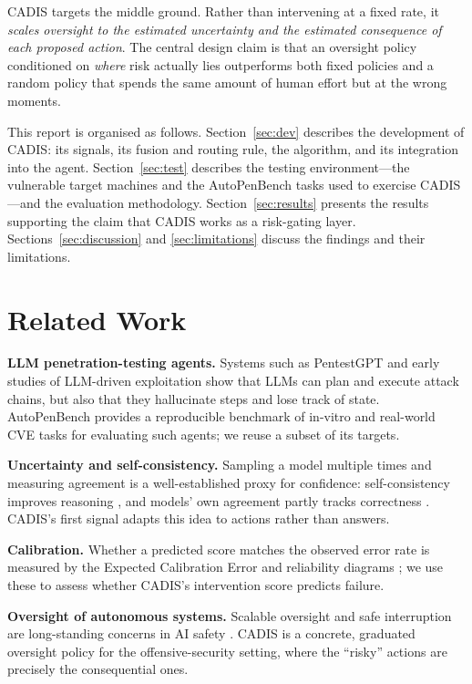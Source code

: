 \documentclass[11pt]{article}
\begin{document}
CADIS targets the middle ground. Rather than intervening at a fixed rate, it \emph{scales oversight to
the estimated uncertainty and the estimated consequence of each proposed action}. The central design
claim is that an oversight policy conditioned on \emph{where} risk actually lies outperforms both fixed
policies and a random policy that spends the same amount of human effort but at the wrong moments.

This report is organised as follows. Section~\ref{sec:dev} describes the development of CADIS: its
signals, its fusion and routing rule, the algorithm, and its integration into the agent.
Section~\ref{sec:test} describes the testing environment---the vulnerable target machines and the
AutoPenBench tasks used to exercise CADIS---and the evaluation methodology. Section~\ref{sec:results}
presents the results supporting the claim that CADIS works as a risk-gating layer.
Sections~\ref{sec:discussion} and \ref{sec:limitations} discuss the findings and their limitations.

\section{Related Work}
\textbf{LLM penetration-testing agents.} Systems such as PentestGPT \citep{deng2024pentestgpt} and
early studies of LLM-driven exploitation \citep{happe2023pwned} show that LLMs can plan and execute
attack chains, but also that they hallucinate steps and lose track of state. AutoPenBench
\citep{gioacchini2024autopenbench} provides a reproducible benchmark of in-vitro and real-world CVE
tasks for evaluating such agents; we reuse a subset of its targets.

\textbf{Uncertainty and self-consistency.} Sampling a model multiple times and measuring agreement is a
well-established proxy for confidence: self-consistency improves reasoning \citep{wang2023selfconsistency},
and models' own agreement partly tracks correctness \citep{kadavath2022know}. CADIS's first signal
adapts this idea to actions rather than answers.

\textbf{Calibration.} Whether a predicted score matches the observed error rate is measured by the
Expected Calibration Error and reliability diagrams \citep{guo2017calibration}; we use these to assess
whether CADIS's intervention score predicts failure.

\textbf{Oversight of autonomous systems.} Scalable oversight and safe interruption are long-standing
concerns in AI safety \citep{amodei2016concrete}. CADIS is a concrete, graduated oversight policy for
the offensive-security setting, where the ``risky'' actions are precisely the consequential ones.
\end{document}
